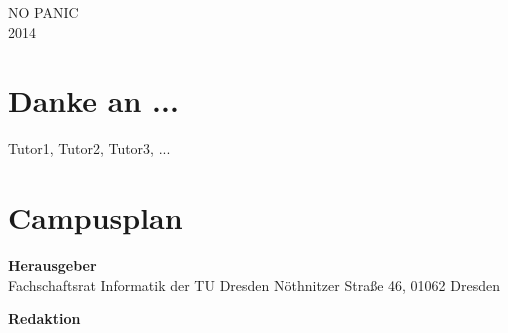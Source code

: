 \documentclass[12pt]{article}
\begin{document}
NO PANIC \\
2014
\newpage


\tableofcontents


\section{Danke an ...}

Tutor1, Tutor2, Tutor3, ...


















\section{Campusplan}


\newpage
\textbf{Herausgeber} \\
Fachschaftsrat Informatik der TU Dresden
Nöthnitzer Straße 46, 01062 Dresden

\textbf{Redaktion} \\
\end{document}
